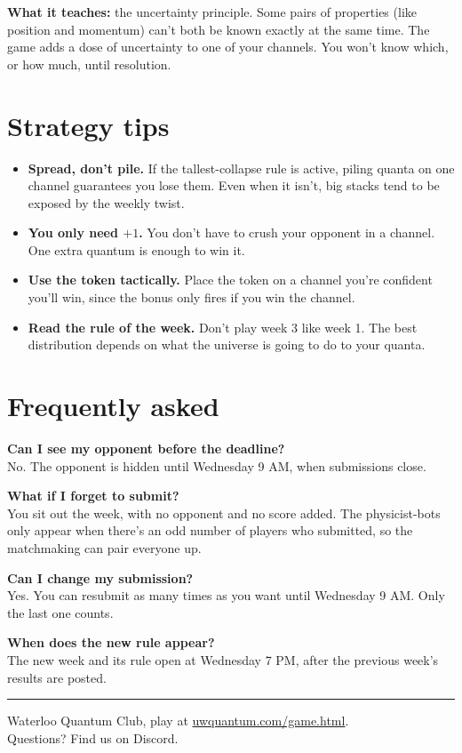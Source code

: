 \documentclass[11pt]{article}
\begin{document}
\textbf{What it teaches:} the uncertainty principle. Some pairs of properties
(like position and momentum) can't both be known exactly at the same time.
The game adds a dose of uncertainty to one of your channels. You won't know
which, or how much, until resolution.

\section{Strategy tips}

\begin{itemize}[leftmargin=1.5em]
    \item \textbf{Spread, don't pile.} If the tallest-collapse rule is active,
          piling quanta on one channel guarantees you lose them. Even when it
          isn't, big stacks tend to be exposed by the weekly twist.
    \item \textbf{You only need $+1$.} You don't have to crush your opponent in
          a channel. One extra quantum is enough to win it.
    \item \textbf{Use the token tactically.} Place the token on a channel
          you're confident you'll win, since the bonus only fires if you win
          the channel.
    \item \textbf{Read the rule of the week.} Don't play week 3 like week 1.
          The best distribution depends on what the universe is going to do
          to your quanta.
\end{itemize}

\section{Frequently asked}

\textbf{Can I see my opponent before the deadline?} \\
No. The opponent is hidden until Wednesday 9 AM, when submissions close.

\textbf{What if I forget to submit?} \\
You sit out the week, with no opponent and no score added. The physicist-bots
only appear when there's an odd number of players who submitted, so the
matchmaking can pair everyone up.

\textbf{Can I change my submission?} \\
Yes. You can resubmit as many times as you want until Wednesday 9 AM. Only
the last one counts.

\textbf{When does the new rule appear?} \\
The new week and its rule open at Wednesday 7 PM, after the previous week's
results are posted.

\vspace{1em}
\hrule
\vspace{0.4em}
\begin{center}
\small
Waterloo Quantum Club, play at \href{https://uwquantum.com/game.html}{uwquantum.com/game.html}.\\
Questions? Find us on Discord.
\end{center}
\end{document}

